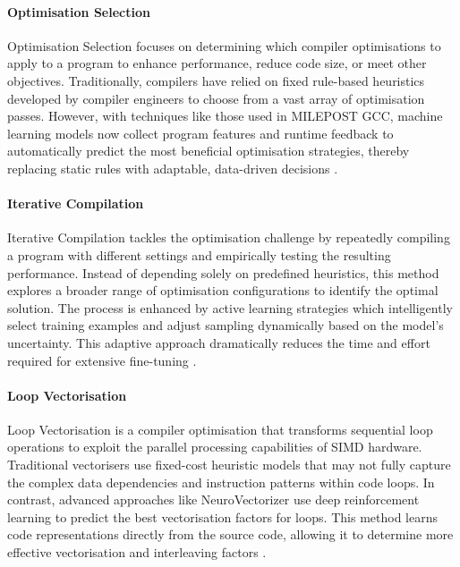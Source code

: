 \paragraph{Optimisation Selection} Optimisation Selection focuses on determining which compiler optimisations to apply to a program to enhance performance, reduce code size, or meet other objectives. Traditionally, compilers have relied on fixed rule-based heuristics developed by compiler engineers to choose from a vast array of optimisation passes. However, with techniques like those used in MILEPOST GCC, machine learning models now collect program features and runtime feedback to automatically predict the most beneficial optimisation strategies, thereby replacing static rules with adaptable, data-driven decisions \cite{OptimisationSelectionML}.

\paragraph{Iterative Compilation} Iterative Compilation tackles the optimisation challenge by repeatedly compiling a program with different settings and empirically testing the resulting performance. Instead of depending solely on predefined heuristics, this method explores a broader range of optimisation configurations to identify the optimal solution. The process is enhanced by active learning strategies which intelligently select training examples and adjust sampling dynamically based on the model's uncertainty. This adaptive approach dramatically reduces the time and effort required for extensive fine-tuning \cite{IterativeCompilationWActiveLearningML}.

\paragraph{Loop Vectorisation} Loop Vectorisation is a compiler optimisation that transforms sequential loop operations to exploit the parallel processing capabilities of SIMD hardware. Traditional vectorisers use fixed-cost heuristic models that may not fully capture the complex data dependencies and instruction patterns within code loops. In contrast, advanced approaches like NeuroVectorizer use deep reinforcement learning to predict the best vectorisation factors for loops. This method learns code representations directly from the source code, allowing it to determine more effective vectorisation and interleaving factors \cite{LoopVectorisationML}.

